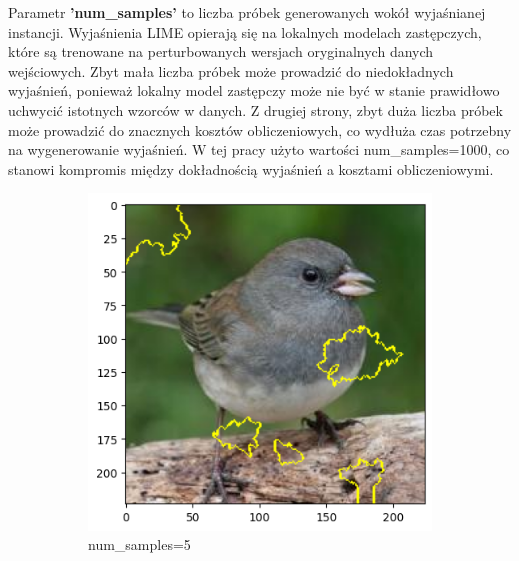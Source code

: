 Parametr \textbf{'num\_samples'} to liczba próbek generowanych wokół wyjaśnianej instancji.
Wyjaśnienia LIME opierają się na lokalnych modelach zastępczych, które są trenowane na perturbowanych wersjach oryginalnych danych wejściowych.
Zbyt mała liczba próbek może prowadzić do niedokładnych wyjaśnień, ponieważ lokalny model zastępczy może nie być w stanie prawidłowo uchwycić istotnych wzorców w danych.
Z drugiej strony, zbyt duża liczba próbek może prowadzić do znacznych kosztów obliczeniowych, co wydłuża czas potrzebny na wygenerowanie wyjaśnień.
W tej pracy użyto wartości num\_samples=1000, co stanowi kompromis między dokładnością wyjaśnień a kosztami obliczeniowymi.

\begin{figure}
	\centering
	\begin{subfigure}[b]{0.3\textwidth}
		\includegraphics[width=.9\textwidth]{img/parameters/lime/num_samples_5}
		\caption{num\_samples=5}  \label{rys:parameters_lime_numsamples_5}
	\end{subfigure}
	\begin{subfigure}[b]{0.3\textwidth}

\end{subfigure}
\end{figure}

